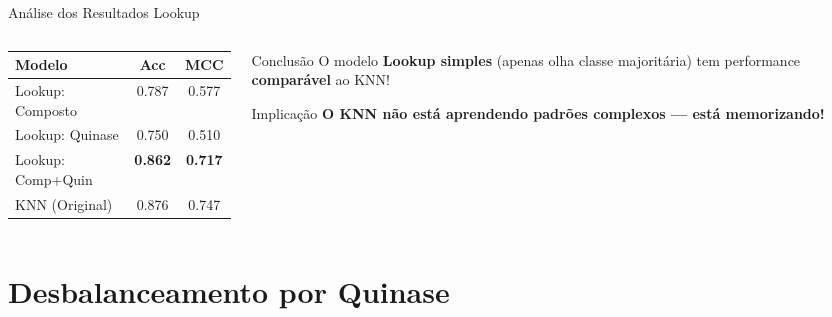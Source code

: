 \documentclass[aspectratio=169,11pt]{beamer}
\begin{document}
\begin{frame}{Análise dos Resultados Lookup}
    \begin{columns}
        \begin{column}{0.5\textwidth}
            \begin{table}
                \centering
                \small
                \begin{tabular}{lcc}
                    \toprule
                    \textbf{Modelo} & \textbf{Acc} & \textbf{MCC} \\
                    \midrule
                    Lookup: Composto & 0.787 & 0.577 \\
                    Lookup: Quinase & 0.750 & 0.510 \\
                    Lookup: Comp+Quin & \textbf{0.862} & \textbf{0.717} \\
                    \midrule
                    KNN (Original) & 0.876 & 0.747 \\
                    \bottomrule
                \end{tabular}
            \end{table}
        \end{column}
        \begin{column}{0.5\textwidth}
            \begin{alertblock}{Conclusão}
                O modelo \textbf{Lookup simples} (apenas olha classe majoritária) tem performance \textbf{comparável} ao KNN!
            \end{alertblock}

            \vspace{0.3cm}
            \begin{block}{Implicação}
                \textcolor{alertred}{\textbf{O KNN não está aprendendo padrões complexos --- está memorizando!}}
            \end{block}
        \end{column}
    \end{columns}
\end{frame}

\section{Desbalanceamento por Quinase}
\end{document}
